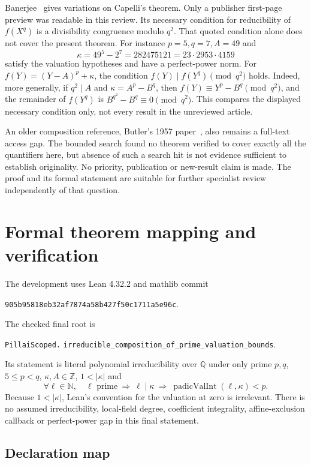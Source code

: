 \documentclass[11pt,letterpaper]{article}
\theoremstyle{remark}\newtheorem{remark}[theorem]{Remark}
\newcommand{\Q}{\mathbb Q}
\newcommand{\Z}{\mathbb Z}
\newcommand{\lean}[1]{{\small\urlstyle{tt}\nolinkurl{#1}}}
\begin{document}
Banerjee~\cite{Banerjee} gives variations on Capelli's theorem. Only a
publisher first-page preview was readable in this review. Its necessary
condition for reducibility of $f(X^q)$ is a divisibility congruence modulo
$q^2$. That quoted condition alone does not cover the present theorem.
For instance $p=5,q=7,A=49$ and
\[
           \kappa=49^5-2^7=282475121=23\cdot2953\cdot4159
\]
satisfy the valuation hypotheses and have a perfect-power norm. For
$f(Y)=(Y-A)^p+\kappa$, the condition
$f(Y)\mid f(Y^q)\pmod{q^2}$ holds. Indeed, more generally, if $q^2\mid A$
and $\kappa=A^p-B^q$, then $f(Y)\equiv Y^p-B^q\pmod{q^2}$, and the
remainder of $f(Y^q)$ is $B^{q^2}-B^q\equiv0\pmod{q^2}$.
This compares the displayed necessary condition only, not every result in
the unreviewed article.

An older composition reference, Butler's 1957 paper~\cite{Butler}, also
remains a full-text access gap. The bounded search found no theorem verified
to cover exactly all the quantifiers here, but absence of such a search
hit is not evidence sufficient to establish originality. No priority,
publication or new-result claim is made. The proof and its formal statement
are suitable for further specialist review independently of that question.

\section{Formal theorem mapping and verification}\label{sec:verification}

The development uses Lean 4.32.2 and mathlib commit
\begin{center}\small\texttt{905b95818eb32af7874a58b427f50c1711a5e96c}.\end{center}
The checked final root is
\begin{center}\small
\lean{PillaiScoped.}\allowbreak
\lean{irreducible_composition_of_prime_valuation_bounds}.
\end{center}
Its statement is literal polynomial irreducibility over $\Q$ under only
prime $p,q$, $5\le p<q$, $\kappa,A\in\Z$, $1<|\kappa|$ and
\[
 \forall\ell\in\mathbb N,\quad
 \ell\text{ prime}\ \Longrightarrow\ \ell\mid\kappa\
 \Longrightarrow\ \operatorname{padicValInt}(\ell,\kappa)<p.
\]
Because $1<|\kappa|$, Lean's convention for the valuation at zero is
irrelevant. There is no assumed irreducibility, local-field degree,
coefficient integrality, affine-exclusion callback or perfect-power gap
in this final statement.

\subsection{Declaration map}
\end{document}
